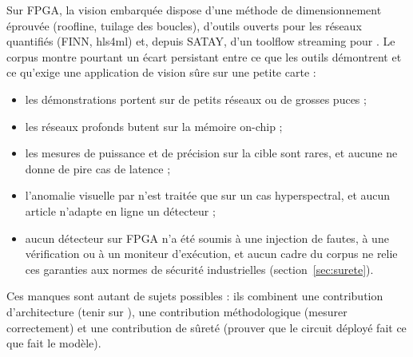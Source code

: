 \documentclass[11pt,a4paper]{article}
\begin{document}
Sur FPGA, la vision embarquée dispose d'une méthode de dimensionnement éprouvée
(roofline, tuilage des boucles), d'outils ouverts pour les réseaux quantifiés (FINN,
hls4ml) et, depuis SATAY, d'un toolflow streaming pour . Le corpus montre pourtant un
écart persistant entre ce que les outils démontrent et ce qu'exige une application de
vision sûre sur une petite carte :
\begin{itemize}
  \item les démonstrations portent sur de petits réseaux ou de grosses puces ;
  \item les réseaux profonds butent sur la mémoire on-chip ;
  \item les mesures de puissance et de précision sur la cible sont rares, et aucune ne
    donne de pire cas de latence ;
  \item l'anomalie visuelle par  n'est traitée que sur un cas hyperspectral, et
    aucun article n'adapte en ligne un détecteur ;
  \item aucun détecteur sur FPGA n'a été soumis à une injection de fautes, à une
    vérification ou à un moniteur d'exécution, et aucun cadre du corpus ne relie ces
    garanties aux normes de sécurité industrielles (section~\ref{sec:surete}).
\end{itemize}
Ces manques sont autant de sujets possibles : ils combinent une contribution
d'architecture (tenir sur ), une contribution méthodologique (mesurer correctement)
et une contribution de sûreté (prouver que le circuit déployé fait ce que fait le modèle).
\end{document}
